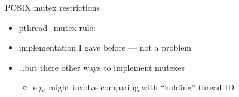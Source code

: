 \begin{frame}{POSIX mutex restrictions}
\begin{itemize}
\item pthread\_mutex rule: 
\vspace{.5cm}
\item implementation I gave before --- not a problem
\item \ldots but there other ways to implement mutexes
    \begin{itemize}
    \item e.g. might involve comparing with ``holding'' thread ID
    \end{itemize}
\end{itemize}
\end{frame}
